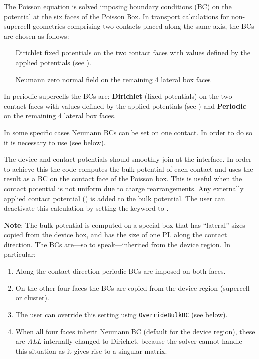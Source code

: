 
The Poisson equation is solved imposing boundary conditions (BC) on the
potential at the six faces of the Poisson Box. In transport calculations for
non-supercell geometries comprising two contacts placed along the same axis, the
BCs are chosen as follows:
\begin{itemize}
\item[Dirichlet] fixed potentials on the two contact faces with values defined
  by the applied potentials (see ).
\item[Neumann] zero normal field on the remaining 4 lateral box faces
\end{itemize}
In periodic supercells the BCs are: {\bf Dirichlet} (fixed potentials) on the
two contact faces with values defined by the applied potentials (see
) and {\bf Periodic} on the remaining 4 lateral box faces.

In some specific cases Neumann BCs can be set on one contact. In order to do so
it is necessary to use  (see below).

The device and contact potentials should smoothly join at the interface. In
order to achieve this the code computes the bulk potential of each contact and
uses the result as a BC on the contact face of the Poisson box. This is useful
when the contact potential is not uniform due to charge rearrangements. Any
externally applied contact potential () is added to the bulk
potential.  The user can deactivate this calculation by setting the keyword
 to .

{\bf Note}: The bulk potential is computed on a special box that has ``lateral''
sizes copied from the device box, and has the size of one PL along the contact
direction. The BCs are---so to speak---inherited from the device region. In
particular:
\begin{enumerate}
\item Along the contact direction periodic BCs are imposed on both faces.
\item On the other four faces the BCs are copied from the device region
  (supercell or cluster).
\item The user can override this setting using \verb|OverrideBulkBC| (see
  below).
\item When all four faces inherit Neumann BC (default for the device region),
  these are {\em ALL} internally changed to Dirichlet, because the solver cannot
  handle this situation as it gives rise to a singular matrix.
\end{enumerate}

